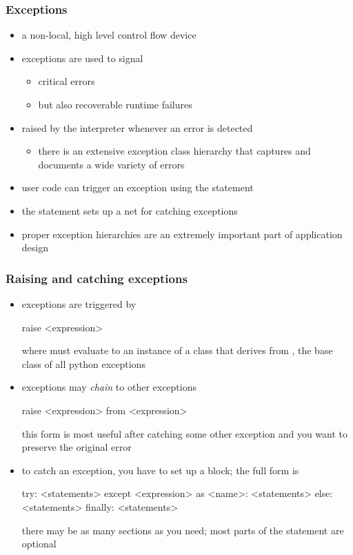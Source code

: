 \begin{frame}[fragile]
%
  \frametitle{Exceptions}
%
  \begin{itemize}
%
  \item a non-local, high level control flow device
%
  \item exceptions are used to signal
    \begin{itemize}
    \item critical errors
    \item but also recoverable runtime failures
    \end{itemize}
%
  \item raised by the interpreter whenever an error is detected
    \begin{itemize}
    \item there is an extensive exception class hierarchy that captures and documents a wide
      variety of errors
    \end{itemize}
%
  \item user code can trigger an exception using the  statement
%
  \item the  statement sets up a net for catching exceptions
%
  \item proper exception hierarchies are an extremely important part of application design
%
  \end{itemize}
%
\end{frame}

\begin{frame}[fragile]
%
  \frametitle{Raising and catching exceptions}
%
  \begin{itemize}
%
  \item exceptions are triggered by 
    \begin{ipython}{}
      raise <expression>
    \end{ipython}
    where  must evaluate to an instance of a class that derives from
    , the base class of all python exceptions
%
  \item exceptions may \emph{chain} to other exceptions
    \begin{ipython}{}
      raise <expression> from <expression>
    \end{ipython}
    this form is most useful after catching some other exception and you want to preserve the
    original error
%
  \item to catch an exception, you have to set up a  block; the full form is
    \begin{ipython}{}
      try:
          <statements>
      except <expression> as <name>:
          <statements>
      else:
          <statements>
      finally:
          <statements>
    \end{ipython}
    there may be as many  sections as you need; most parts of the statement are
    optional
%
  \end{itemize}
%
\end{frame}

